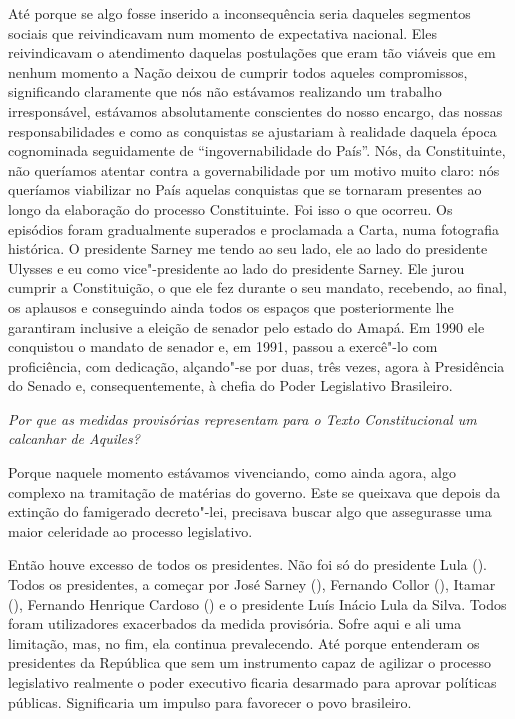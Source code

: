 Até porque se algo fosse inserido a inconsequência seria daqueles
segmentos sociais que reivindicavam num momento de expectativa nacional.
Eles reivindicavam o atendimento daquelas postulações que eram tão
viáveis que em nenhum momento a Nação deixou de cumprir todos aqueles
compromissos, significando claramente que nós não estávamos realizando
um trabalho irresponsável, estávamos absolutamente conscientes do nosso
encargo, das nossas responsabilidades e como as conquistas se ajustariam
à realidade daquela época cognominada seguidamente de
``ingovernabilidade do País''. Nós, da Constituinte, não queríamos
atentar contra a governabilidade por um motivo muito claro: nós
queríamos viabilizar no País aquelas conquistas que se tornaram
presentes ao longo da elaboração do processo Constituinte. Foi isso o
que ocorreu. Os episódios foram gradualmente superados e proclamada a
Carta, numa fotografia histórica. O presidente Sarney me tendo ao seu
lado, ele ao lado do presidente Ulysses e eu como vice"-presidente ao
lado do presidente Sarney. Ele jurou cumprir a Constituição, o que ele
fez durante o seu mandato, recebendo, ao final, os aplausos e
conseguindo ainda todos os espaços que posteriormente lhe garantiram
inclusive a eleição de senador pelo estado do Amapá. Em 1990 ele
conquistou o mandato de senador e, em 1991, passou a exercê"-lo com
proficiência, com dedicação, alçando"-se por duas, três vezes, agora à
Presidência do Senado e, consequentemente, à chefia do Poder Legislativo
Brasileiro.

\medskip

\noindent\emph{Por que as medidas provisórias representam para o Texto
Constitucional um calcanhar de Aquiles?}

Porque naquele momento estávamos vivenciando, como
ainda agora, algo complexo na tramitação de matérias do governo. Este se
queixava que depois da extinção do famigerado decreto"-lei, precisava
buscar algo que assegurasse uma maior celeridade ao processo
legislativo.

Então houve excesso de todos os presidentes. Não foi só do presidente
Lula (). Todos os presidentes, a começar por José Sarney (),
Fernando Collor (), Itamar (), Fernando Henrique Cardoso () e
o presidente Luís Inácio Lula da Silva. Todos foram utilizadores
exacerbados da medida provisória. Sofre aqui e ali uma limitação, mas,
no fim, ela continua prevalecendo. Até porque entenderam os presidentes
da República que sem um instrumento capaz de agilizar o processo
legislativo realmente o poder executivo ficaria desarmado para aprovar
políticas públicas. Significaria um impulso para favorecer o povo
brasileiro.

